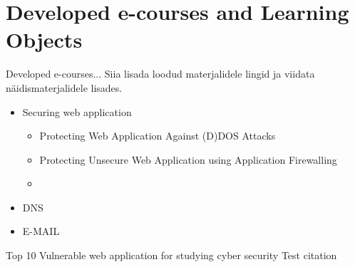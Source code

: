 \section{Developed e-courses and Learning Objects}
\label{Developed e-courses and Learning Objects}
Developed e-courses...
{\color{red} Siia lisada loodud materjalidele lingid ja viidata näidismaterjalidele lisades.}
\begin{itemize}
	\item Securing web application
		\begin{itemize}
			\item Protecting Web Application Against (D)DOS Attacks
			\item Protecting Unsecure Web Application using Application Firewalling
			\item 
		\end{itemize}
	\item DNS
	\item E-MAIL
\end{itemize}

Top 10 Vulnerable web application for studying cyber security  \cite{url:pulse}
Test citation \cite{10VulnerApps} \cite{greenwade93}
